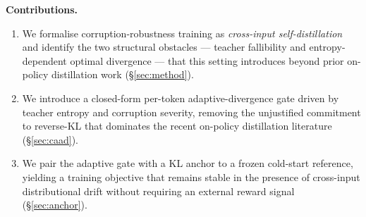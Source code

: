 \documentclass{article}
\begin{document}
\textbf{Contributions.}
\begin{enumerate}[leftmargin=*,nosep]
\item We formalise corruption-robustness training as \emph{cross-input self-distillation} and identify the two structural obstacles --- teacher fallibility and entropy-dependent optimal divergence --- that this setting introduces beyond prior on-policy distillation work (\S\ref{sec:method}).
\item We introduce a closed-form per-token adaptive-divergence gate driven by teacher entropy and corruption severity, removing the unjustified commitment to reverse-KL that dominates the recent on-policy distillation literature (\S\ref{sec:caad}).
\item We pair the adaptive gate with a KL anchor to a frozen cold-start reference, yielding a training objective that remains stable in the presence of cross-input distributional drift without requiring an external reward signal (\S\ref{sec:anchor}).
\end{enumerate}
\end{document}
